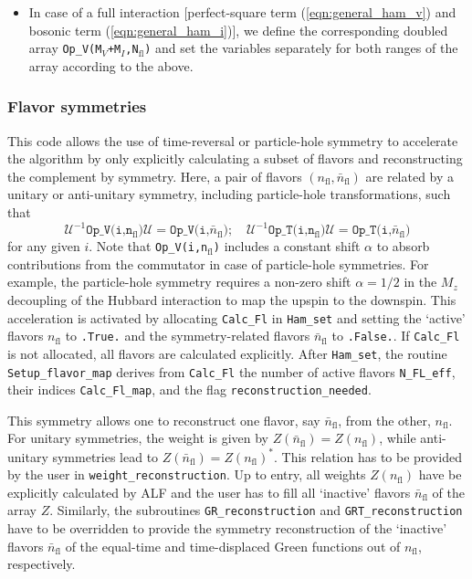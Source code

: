 \begin{itemize}
\item In case of a full interaction [perfect-square term (\ref{eqn:general_ham_v}) and bosonic term (\ref{eqn:general_ham_i})],
we  define  the corresponding doubled array \texttt{Op\_V(M$_V$+M$_I$,N$_\mathrm{fl}$)} and set the variables separately for both ranges of the array according to the above.  

\end{itemize}

\subsubsection{Flavor symmetries}
\label{sec:flavor_sym}

This code allows the use of time-reversal or particle-hole symmetry to accelerate the algorithm by only explicitly calculating a subset of flavors and reconstructing the complement by symmetry.
Here, a pair of flavors $(n_\mathrm{fl},\bar{n}_\mathrm{fl})$ are related by a unitary or anti-unitary symmetry, including particle-hole transformations, such that
\begin{equation}
	\mathcal{U}^{-1} \texttt{Op\_V(i,n$_\mathrm{fl}$)} \mathcal{U} = \texttt{Op\_V(i,$\bar{n}_\mathrm{fl}$)}; \quad 
	\mathcal{U}^{-1} \texttt{Op\_T(i,n$_\mathrm{fl}$)} \mathcal{U} = \texttt{Op\_T(i,$\bar{n}_\mathrm{fl}$)}
\end{equation}
for any given $i$. Note that \texttt{Op\_V(i,n$_\mathrm{fl}$)} includes a constant shift $\alpha$ to absorb contributions from the commutator in case of particle-hole symmetries.
For example, the particle-hole symmetry requires a non-zero shift $\alpha=1/2$ in the $M_z$ decoupling of the Hubbard interaction to map the upspin to the downspin.
This acceleration is activated by allocating \texttt{Calc\_Fl} in \texttt{Ham\_set} and setting the `active' flavors $n_\mathrm{fl}$ to \texttt{.True.} and the symmetry-related flavors $\bar{n}_\mathrm{fl}$ to \texttt{.False.}.
If \texttt{Calc\_Fl} is not allocated, all flavors are calculated explicitly. After \texttt{Ham\_set}, the routine \texttt{Setup\_flavor\_map} derives from \texttt{Calc\_Fl} the number of active flavors \texttt{N\_FL\_eff}, their indices \texttt{Calc\_Fl\_map}, and the flag \texttt{reconstruction\_needed}.


This symmetry allows one to reconstruct one flavor, say $\bar{n}_\mathrm{fl}$, from the other, $n_\mathrm{fl}$. For unitary symmetries, the weight is given by $Z(\bar{n}_\mathrm{fl})=Z(n_\mathrm{fl})$, while anti-unitary symmetries lead to $Z(\bar{n}_\mathrm{fl})=Z(n_\mathrm{fl})^*$. This relation has to be provided by the user in  \texttt{weight\_reconstruction}. Up to entry, all weights $Z(n_\mathrm{fl})$ have be explicitly calculated by ALF and the user has to fill all `inactive' flavors $\bar{n}_\mathrm{fl}$ of the array $Z$.
Similarly, the subroutines \texttt{GR\_reconstruction} and \texttt{GRT\_reconstruction} have to be overridden to provide the symmetry reconstruction of the `inactive' flavors $\bar{n}_\mathrm{fl}$ of the equal-time and time-displaced Green functions out of $n_\mathrm{fl}$, respectively.

